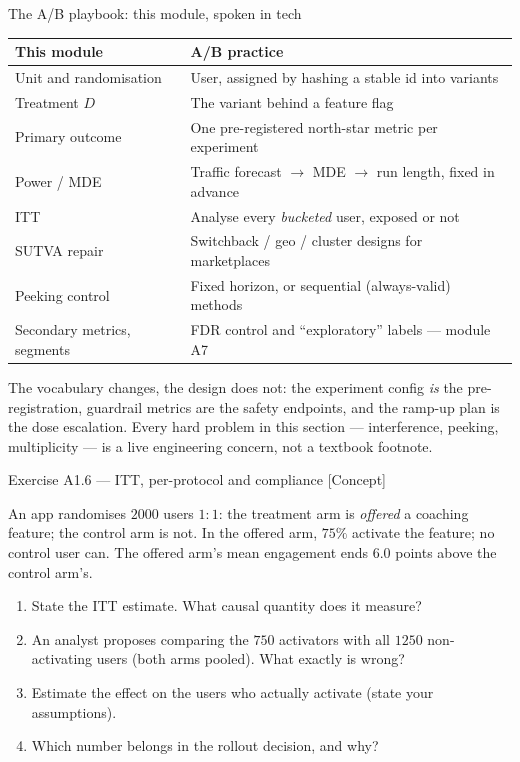 \documentclass[aspectratio=169,11pt]{beamer}
\begin{document}
\begin{frame}{The A/B playbook: this module, spoken in tech}
  \scriptsize
  \begin{center}
  \begin{tabular}{@{}p{4.1cm}p{7.9cm}@{}}
    \toprule
    \textbf{This module} & \textbf{A/B practice} \\
    \midrule
    Unit and randomisation & User, assigned by hashing a stable id into variants \\
    Treatment $D$ & The variant behind a feature flag \\
    Primary outcome & One pre-registered north-star metric per experiment \\
    Power / MDE & Traffic forecast $\to$ MDE $\to$ run length, fixed in advance \\
    ITT & Analyse every \emph{bucketed} user, exposed or not \\
    SUTVA repair & Switchback / geo / cluster designs for marketplaces \\
    Peeking control & Fixed horizon, or sequential (always-valid) methods \\
    Secondary metrics, segments & FDR control and ``exploratory'' labels --- module A7 \\
    \bottomrule
  \end{tabular}
  \end{center}
  The vocabulary changes, the design does not: the experiment config \emph{is} the
  pre-registration, guardrail metrics are the safety endpoints, and the ramp-up plan is
  the dose escalation. Every hard problem in this section --- interference, peeking,
  multiplicity --- is a live engineering concern, not a textbook footnote.
\end{frame}

\begin{frame}{Exercise A1.6 --- ITT, per-protocol and compliance [Concept]}
\begin{exercise}
  An app randomises $2000$ users $1{:}1$: the treatment arm is \emph{offered} a coaching
  feature; the control arm is not. In the offered arm, $75\%$ activate the feature;
  no control user can. The offered arm's mean engagement ends $6.0$ points above the
  control arm's.
  \begin{enumerate}
    \item State the ITT estimate. What causal quantity does it measure?
    \item An analyst proposes comparing the $750$ activators with all $1250$
          non-activating users (both arms pooled). What exactly is wrong?
    \item Estimate the effect on the users who actually activate (state your assumptions).
    \item Which number belongs in the rollout decision, and why?
  \end{enumerate}
\end{exercise}
\end{frame}
\end{document}
